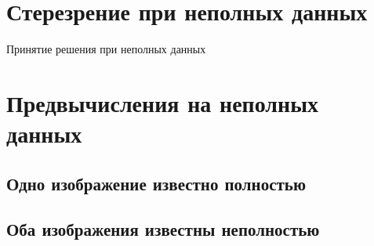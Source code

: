 	
	
\section{Стерезрение при неполных данных}
	Принятие решения при неполных данных 
	


\section{Предвычисления на неполных данных}

	\subsection{Одно изображение известно полностью}
	
	\subsection{Оба изображения известны неполностью}
